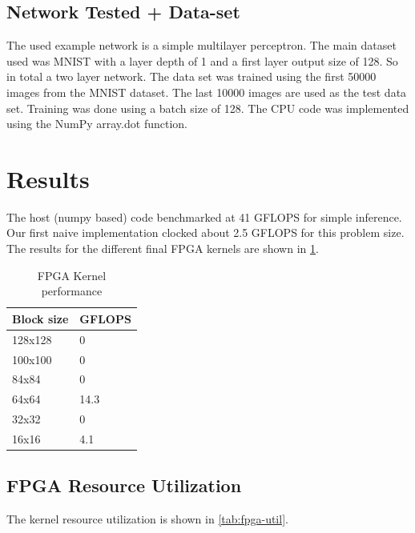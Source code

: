 \documentclass[techrep,english]{ipsj} %
\begin{document}
\subsection{Network Tested + Data-set}
The used example network is a simple multilayer perceptron.
The main dataset used was MNIST with a layer depth of 1 and a first layer output size of 128.
So in total a two layer network.
The data set was trained using the first \num{50000} images from the MNIST dataset.
The last \num{10000} images are used as the test data set.
Training was done using a batch size of 128.
The CPU code was implemented using the NumPy array.dot function.

\section{Results}\label{sec:result}
The host (numpy based) code benchmarked at \num{41} GFLOPS for simple inference.
Our first naive implementation clocked about \num{2.5} GFLOPS for this problem size.
The results for the different final FPGA kernels are shown in \cref{tab:kernel-performance}.

\begin{table}[h]
  \centering
  \caption{FPGA Kernel performance}\label{tab:kernel-performance}
  \begin{tabular}{ll}
    \toprule
    \textbf{Block size} & \textbf{GFLOPS}  \\
    \midrule
    128x128 & \num{0}  \\
    100x100 & \num{0} \\
    84x84 & \num{0}  \\
    64x64 & \num{14.3}  \\
    32x32 & \num{0}  \\
    16x16 & \num{4.1}  \\
    \bottomrule
  \end{tabular}
\end{table}


\subsection{FPGA Resource Utilization}
The kernel resource utilization is shown in \cref{tab:fpga-util}.
\end{document}
